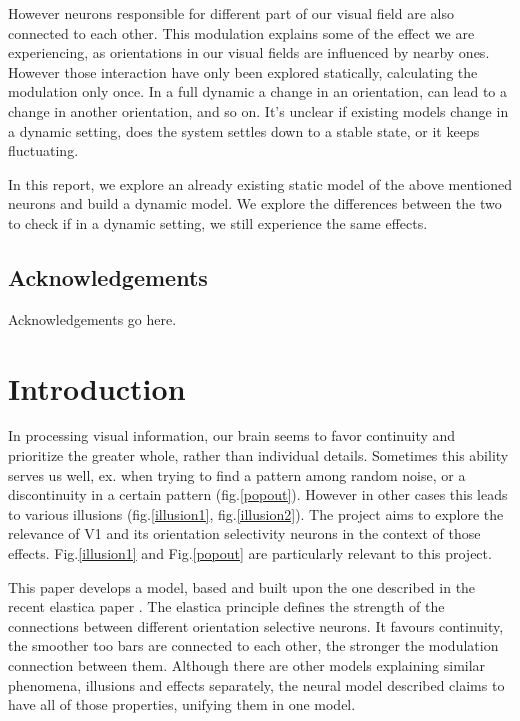 {However neurons responsible for different part of our visual field are also connected to each other. This modulation explains some of the effect we are experiencing, as orientations in our visual fields are influenced by nearby ones. However those interaction have only been explored statically, calculating the modulation only once. In a full dynamic a change in an orientation, can lead to a change in another orientation, and so on. It's unclear if existing models change in a dynamic setting, does the system settles down to a stable state, or it keeps fluctuating.

In this report, we explore an already existing static model of the above mentioned neurons and build a dynamic model. We explore the differences between the two to check if in a dynamic setting, we still experience the same effects. 
}

\maketitle

\section*{Acknowledgements}
Acknowledgements go here. 

\tableofcontents



\chapter{Introduction}

In processing visual information, our brain seems to favor continuity and prioritize the greater whole, rather than individual details. Sometimes this ability serves us well, ex. when trying to find a pattern among random noise, or a discontinuity in a certain pattern (fig.\ref{popout}). However in other cases this leads to various illusions (fig.\ref{illusion1}, fig.\ref{illusion2}). The project aims to explore the relevance of V1 and its orientation selectivity neurons in the context of those effects. Fig.\ref{illusion1} and Fig.\ref{popout} are particularly relevant to this project.

This paper develops a model, based and built upon the one described in the recent elastica paper \cite{keemink2015unified}. The elastica principle defines the strength of the connections between different orientation selective neurons. It favours continuity, the smoother too bars are connected to each other, the stronger the modulation connection between them. Although there are other models explaining similar phenomena, illusions and effects separately, the neural model described claims to have all of those properties, unifying them in one model. 

